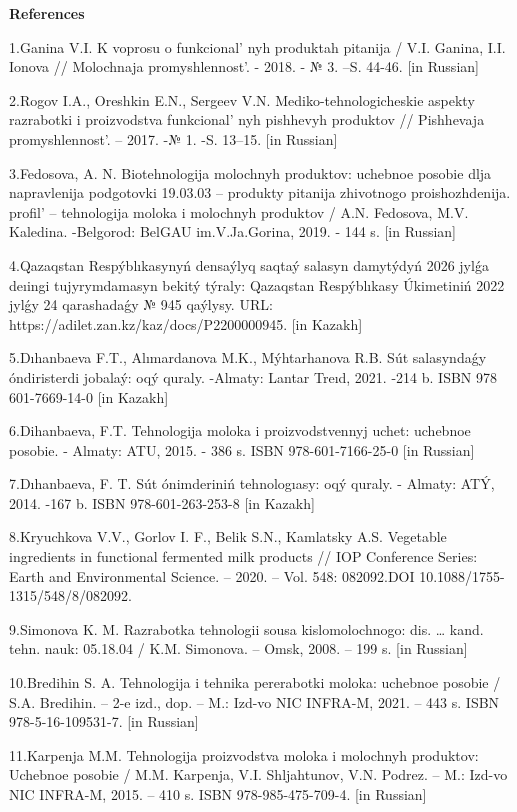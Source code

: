 {{\bfseries References}

1.Ganina V.I. K voprosu o funkcional' nyh produktah
pitanija / V.I. Ganina, I.I. Ionova // Molochnaja
promyshlennost'. - 2018. - № 3. --S. 44-46. {[}in
Russian{]}

2.Rogov I.A., Oreshkin E.N., Sergeev V.N. Mediko-tehnologicheskie
aspekty razrabotki i proizvodstva funkcional' nyh
pishhevyh produktov // Pishhevaja promyshlennost'. --
2017. -№ 1. -S. 13--15. {[}in Russian{]}

3.Fedosova, A. N. Biotehnologija molochnyh produktov: uchebnoe posobie
dlja napravlenija podgotovki 19.03.03 -- produkty pitanija zhivotnogo
proishozhdenija. profil'{} -- tehnologija moloka i
molochnyh produktov / A.N. Fedosova, M.V. Kaledina. -Belgorod: BelGAU
im.V.Ja.Gorina, 2019. - 144 s. {[}in Russian{]}

4.Qazaqstan Respýblıkasynyń densaýlyq saqtaý salasyn damytýdyń 2026
jylǵa deıingi tujyrymdamasyn bekitý týraly: Qazaqstan Respýblıkasy
Úkimetiniń 2022 jylǵy 24 qarashadaǵy № 945 qaýlysy. URL:
https://adilet.zan.kz/kaz/docs/P2200000945. {[}in Kazakh{]}

5.Dıhanbaeva F.T., Alımardanova M.K., Mýhtarhanova R.B. Sút salasyndaǵy
óndiristerdi jobalaý: oqý quraly. -Almaty: Lantar Treıd, 2021. -214 b.
ISBN 978 601-7669-14-0 {[}in Kazakh{]}

6.Dihanbaeva, F.T. Tehnologija moloka i proizvodstvennyj uchet: uchebnoe
posobie. - Almaty: ATU, 2015. - 386 s. ISBN 978-601-7166-25-0 {[}in
Russian{]}

7.Dıhanbaeva, F. T. Sút ónimderiniń tehnologıasy: oqý quraly. - Almaty:
ATÝ, 2014. -167 b. ISBN 978-601-263-253-8 {[}in Kazakh{]}

8.Kryuchkova V.V., Gorlov I. F., Belik S.N., Kamlatsky A.S. Vegetable
ingredients in functional fermented milk products // IOP Conference
Series: Earth and Environmental Science. -- 2020. -- Vol. 548:
082092.DOI 10.1088/1755-1315/548/8/082092.

9.Simonova K. M. Razrabotka tehnologii sousa kislomolochnogo: dis.
\ldots{} kand. tehn. nauk: 05.18.04 / K.M. Simonova. -- Omsk, 2008. --
199 s. {[}in Russian{]}

10.Bredihin S. A. Tehnologija i tehnika pererabotki moloka: uchebnoe
posobie / S.A. Bredihin. -- 2-e izd., dop. -- M.: Izd-vo NIC INFRA-M,
2021. -- 443 s. ISBN 978-5-16-109531-7. {[}in Russian{]}

11.Karpenja M.M. Tehnologija proizvodstva moloka i molochnyh produktov:
Uchebnoe posobie / M.M. Karpenja, V.I. Shljahtunov, V.N. Podrez. -- M.:
Izd-vo NIC INFRA-M, 2015. -- 410 s. ISBN 978-985-475-709-4. {[}in
Russian{]}

}
